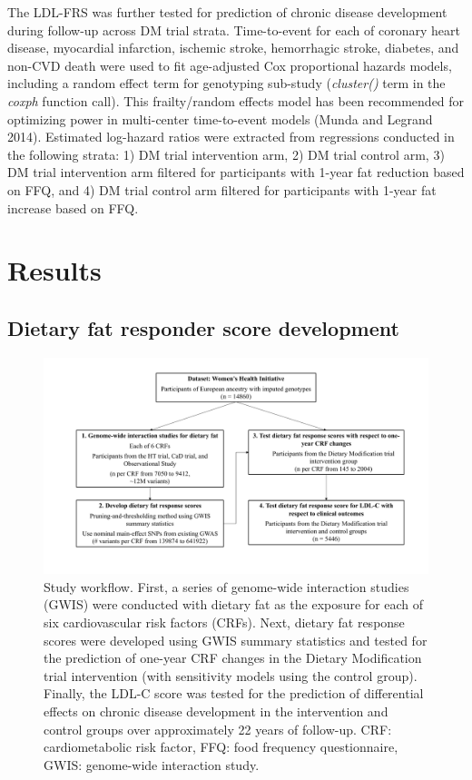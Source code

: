 \documentclass[]{article}
\begin{document}
The LDL-FRS was further tested for prediction of chronic disease
development during follow-up across DM trial strata. Time-to-event for
each of coronary heart disease, myocardial infarction, ischemic stroke,
hemorrhagic stroke, diabetes, and non-CVD death were used to fit
age-adjusted Cox proportional hazards models, including a random effect
term for genotyping sub-study (\emph{cluster()} term in the \emph{coxph}
function call). This frailty/random effects model has been recommended
for optimizing power in multi-center time-to-event models (Munda and
Legrand 2014). Estimated log-hazard ratios were extracted from
regressions conducted in the following strata: 1) DM trial intervention
arm, 2) DM trial control arm, 3) DM trial intervention arm filtered for
participants with 1-year fat reduction based on FFQ, and 4) DM trial
control arm filtered for participants with 1-year fat increase based on
FFQ.

\hypertarget{results}{%
\section{Results}\label{results}}

\hypertarget{dietary-fat-responder-score-development}{%
\subsection{Dietary fat responder score
development}\label{dietary-fat-responder-score-development}}

\begin{figure}
\centering
\includegraphics{workflow.pdf}
\caption{Study workflow. First, a series of genome-wide interaction
studies (GWIS) were conducted with dietary fat as the exposure for each
of six cardiovascular risk factors (CRFs). Next, dietary fat response
scores were developed using GWIS summary statistics and tested for the
prediction of one-year CRF changes in the Dietary Modification trial
intervention (with sensitivity models using the control group). Finally,
the LDL-C score was tested for the prediction of differential effects on
chronic disease development in the intervention and control groups over
approximately 22 years of follow-up. CRF: cardiometabolic risk factor,
FFQ: food frequency questionnaire, GWIS: genome-wide interaction study.}
\end{figure}
\end{document}

